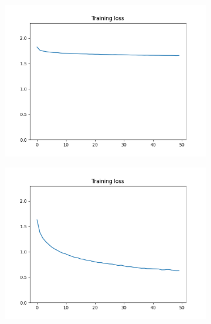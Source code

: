 \documentclass[12pt]{article}
\begin{document}
\begin{figure}
\begin{subfigure}{0.16\textwidth}
    \includegraphics[width=\linewidth]{loss_2_2_1.png}
    \caption{}
    \label{fig:2_2_1}
  \end{subfigure}
  \begin{subfigure}{0.16\textwidth}
    \centering
    \includegraphics[width=\linewidth]{loss_2_3_bs4.png}
    \caption{}
    \label{fig:2_3_bs4}
  \end{subfigure}
  \begin{subfigure}{0.16\textwidth}
    \centering

\end{subfigure}
\end{figure}
\end{document}
